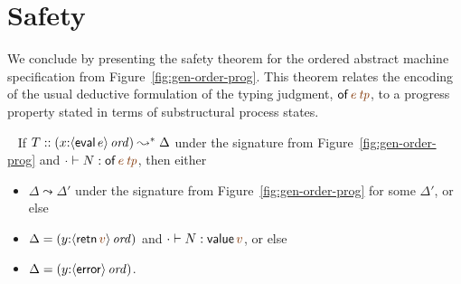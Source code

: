 
\newpage
\section{Safety}

We conclude by presenting the safety theorem for the ordered abstract
machine specification from Figure~\ref{fig:gen-order-prog}. This
theorem relates the encoding of the usual deductive formulation of the
typing judgment, ${\sf of}\,\lf{e}\,\lf{{\it tp}}$, to a progress
property stated in terms of substructural process states.

\bigskip
\begin{theorem}~
If $T :: (x{:}{\langle {{\sf eval}\,e} \rangle}\,{{\it ord}}) \leadsto^* \Delta$
under the signature from Figure~\ref{fig:gen-order-prog} and
$\cdot \vdash N : {\sf of}\,\lf{e}\,\lf{{\it tp}}$,
then either 
\begin{itemize}
\item $\Delta \leadsto \Delta'$ under the signature from
Figure~\ref{fig:gen-order-prog} for some $\Delta'$, or else
\item $\Delta = (y{:}\istrue{\susp{{\sf retn}\,\lf{v}}})$ and $\cdot \vdash N : {\sf value}\,\lf{v}$, or else
\item $\Delta = (y{:}{\langle {{\sf error}} \rangle}\,{{\it ord}})$.
\end{itemize}
\end{theorem}


